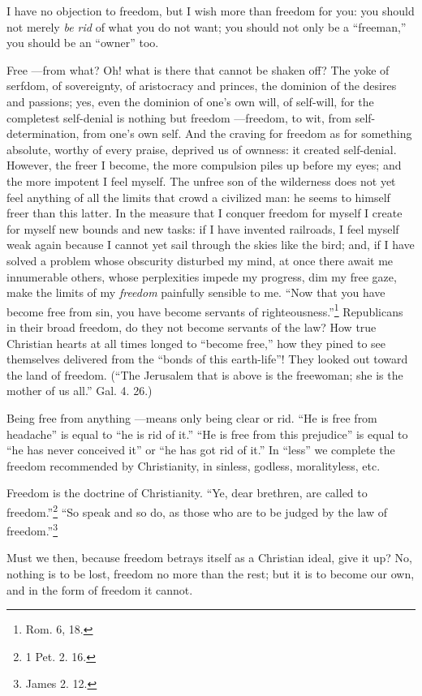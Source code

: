 I have no objection to freedom, but I wish more than freedom for you: you 
should not merely \textit{be rid} of what you do not want; you should not only 
be a ``freeman,'' you should be an ``owner'' too.

Free ---from what? Oh! what is there that cannot be shaken off? The yoke of 
serfdom, of sovereignty, of aristocracy and princes, the dominion of the 
desires and passions; yes, even the dominion of one's own will, of self-will, 
for the completest self-denial is nothing but freedom ---freedom, to wit, from 
self-determination, from one's own self. And the craving for freedom as for 
something absolute, worthy of every praise, deprived us of ownness: it created 
self-denial. However, the freer I become, the more compulsion piles up before 
my eyes; and the more impotent I feel myself. The unfree son of the wilderness 
does not yet feel anything of all the limits that crowd a civilized man: he 
seems to himself freer than this latter. In the measure that I conquer freedom 
for myself I create for myself new bounds and new tasks: if I have invented 
railroads, I feel myself weak again because I cannot yet sail through the 
skies like the bird; and, if I have solved a problem whose obscurity disturbed 
my mind, at once there await me innumerable others, whose perplexities impede 
my progress, dim my free gaze, make the limits of my \textit{freedom} 
painfully sensible to me. ``Now that you have become free from sin, you have 
become servants of righteousness.''\footnote{Rom. 6, 18.} Republicans in 
their broad freedom, do they not become servants of the law? How true 
Christian hearts at all times longed to ``become free,'' how they pined to 
see themselves delivered from the ``bonds of this earth-life''! They looked 
out toward the land of freedom. (``The Jerusalem that is above is the 
freewoman; she is the mother of us all.'' Gal. 4. 26.)

Being free from anything ---means only being clear or rid. ``He is free from 
headache'' is equal to ``he is rid of it.'' ``He is free from this 
prejudice'' is equal to ``he has never conceived it'' or ``he has got rid 
of it.'' In ``less'' we complete the freedom recommended by Christianity, 
in sinless, godless, moralityless, etc.

 Freedom is the doctrine of Christianity. ``Ye, dear brethren, are called to 
freedom.''\footnote{1 Pet. 2. 16.} ``So speak and so do, as those who are to 
be judged by the law of freedom.''\footnote{James 2. 12.}

Must we then, because freedom betrays itself as a Christian ideal, give it up? 
No, nothing is to be lost, freedom no more than the rest; but it is to become 
our own, and in the form of freedom it cannot.

